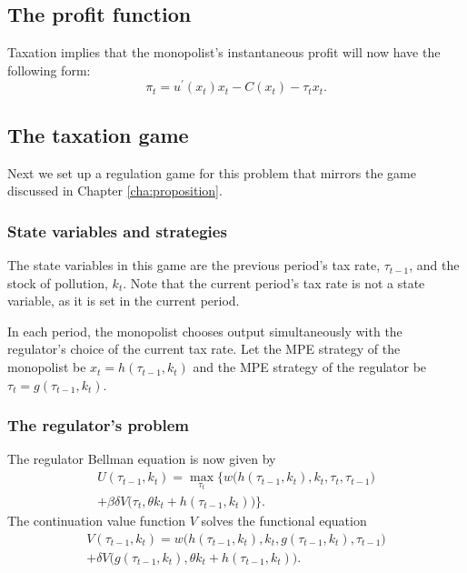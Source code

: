 \subsection{The profit function}

\label{sec:profit-function}

Taxation implies that the monopolist's instantaneous profit will now have
the following form: 
\begin{equation}
\pi _{t}=u^{\prime }(x_{t})x_{t}-C(x_{t})-\tau _{t}x_{t}.  \label{eq:57}
\end{equation}

\subsection{The taxation game}

\label{sec:delegation-game}

Next we set up a regulation game for this problem that mirrors the game
discussed in Chapter \ref{cha:proposition}.

\subsubsection{State variables and strategies}

\label{sec:state-variables-1}

The state variables in this game are the previous period's tax rate, $\tau
_{t-1}$, and the stock of pollution, $k_{t}$. Note that the current period's
tax rate is not a state variable, as it is set in the current period.

In each period, the monopolist chooses output simultaneously with the
regulator's choice of the current tax rate. Let the MPE strategy of the
monopolist be $x_{t}=h(\tau _{t-1},k_{t})$ and the MPE strategy of the
regulator be $\tau _{t}=g(\tau _{t-1},k_{t})$.

\subsubsection{The regulator's problem}

\label{sec:regulators-problem}

The regulator Bellman equation is now given by%
\begin{multline}
U(\tau _{t-1},k_{t})=\max_{\tau _{t}}\bigg\{w\big(h(\tau
_{t-1},k_{t}),k_{t},\tau _{t},\tau _{t-1}\big)  \label{eq:58} \\
+\beta \delta V\big(\tau _{t},\theta k_{t}+h(\tau _{t-1},k_{t})\big)\bigg\}.
\end{multline}%
The continuation value function $V$ solves the functional equation 
\begin{multline}
V(\tau _{t-1},k_{t})=w\big(h(\tau _{t-1},k_{t}),k_{t},g(\tau
_{t-1},k_{t}),\tau _{t-1}\big)  \label{eq:59} \\
+\delta V\big(g(\tau _{t-1},k_{t}),\theta k_{t}+h(\tau _{t-1},k_{t})\big).
\end{multline}

